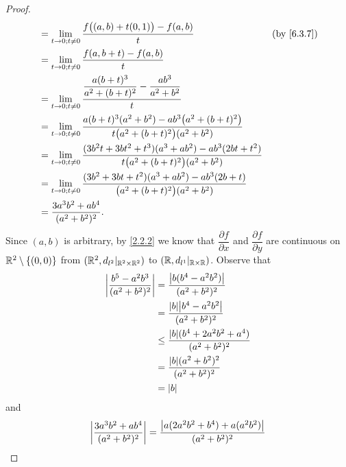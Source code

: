 \begin{proof}
\begin{align*}
     & = \lim_{t \to 0 ; t \neq 0} \dfrac{f\big((a, b) + t(0, 1)\big) - f(a, b)}{t}                                                             &  & \by{6.3.7} \\
     & = \lim_{t \to 0 ; t \neq 0} \dfrac{f(a, b + t) - f(a, b)}{t}                                                                                             \\
     & = \lim_{t \to 0 ; t \neq 0} \dfrac{\dfrac{a (b + t)^3}{a^2 + (b + t)^2} - \dfrac{ab^3}{a^2 + b^2}}{t}                                                    \\
     & = \lim_{t \to 0 ; t \neq 0} \dfrac{a (b + t)^3 (a^2 + b^2) - a b^3 \big(a^2 + (b + t)^2\big)}{t \big(a^2 + (b + t)^2\big) (a^2 + b^2)}                   \\
     & = \lim_{t \to 0 ; t \neq 0} \dfrac{(3 b^2 t + 3 b t^2 + t^3) (a^3 + a b^2) - a b^3 (2bt + t^2)}{t \big(a^2 + (b + t)^2\big) (a^2 + b^2)}                 \\
     & = \lim_{t \to 0 ; t \neq 0} \dfrac{(3 b^2 + 3 b t + t^2) (a^3 + a b^2) - a b^3 (2b + t)}{\big(a^2 + (b + t)^2\big) (a^2 + b^2)}                          \\
     & = \dfrac{3 a^3 b^2 + a b^4}{(a^2 + b^2)^2}.
  \end{align*}
  Since \((a, b)\) is arbitrary, by \cref{2.2.2} we know that \(\dfrac{\partial f}{\partial x}\) and \(\dfrac{\partial f}{\partial y}\) are continuous on \(\mathbb{R}^2 \setminus \{(0, 0)\}\) from \((\mathbb{R}^2, d_{l^2}|_{\mathbb{R}^2 \times \mathbb{R}^2})\) to \((\mathbb{R}, d_{l^1}|_{\mathbb{R} \times \mathbb{R}})\).
  Observe that
  \begin{align*}
    \abs{\dfrac{b^5 - a^2 b^3}{(a^2 + b^2)^2}} & = \dfrac{\abs{b (b^4 - a^2 b^2)}}{(a^2 + b^2)^2}            \\
                                               & = \dfrac{\abs{b} \abs{b^4 - a^2 b^2}}{(a^2 + b^2)^2}        \\
                                               & \leq \dfrac{\abs{b} (b^4 + 2 a^2 b^2 + a^4)}{(a^2 + b^2)^2} \\
                                               & = \dfrac{\abs{b} (a^2 + b^2)^2}{(a^2 + b^2)^2}              \\
                                               & = \abs{b}
  \end{align*}
  and
  \begin{align*}
    \abs{\dfrac{3 a^3 b^2 + a b^4}{(a^2 + b^2)^2}} & = \dfrac{\abs{a (2 a^2 b^2 + b^4) + a (a^2 b^2)}}{(a^2 + b^2)^2}                              \\

\end{align*}
\end{proof}
